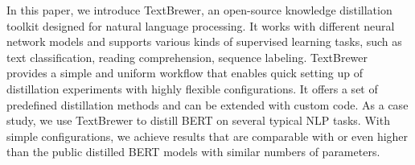 In this paper, we introduce TextBrewer, an open-source knowledge distillation toolkit designed for natural language processing. It works with different neural network models and supports various kinds of supervised learning tasks, such as text classification, reading comprehension, sequence labeling. TextBrewer provides a simple and uniform workflow that enables quick setting up of distillation experiments with highly flexible configurations. It offers a set of predefined distillation methods and can be extended with custom code. As a case study, we use TextBrewer to distill BERT on several typical NLP tasks. With simple configurations, we achieve results that are comparable with or even higher than the public distilled BERT models with similar numbers of parameters.
